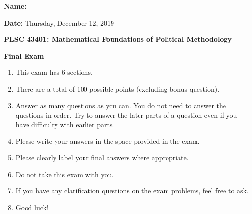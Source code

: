 \documentclass[10pt,letterpaper]{article}
\newcommand\blankpage{%
	\null
	\thispagestyle{empty}%
	\addtocounter{page}{-1}%
	\newpage}
\theoremstyle{definition}
\numberwithin{equation}{section}
\begin{document}
	
\onehalfspacing
	
\textbf{Name:}

\textbf{Date:} Thursday, December 12, 2019

\textbf{PLSC 43401: Mathematical Foundations of Political Methodology}

\textbf{Final Exam}

\begin{enumerate}
	
	\item This exam has 6 sections.
	
	\item There are a total of 100 possible points (excluding bonus question).
	
	\item Answer as many questions as you can. You do not need to answer the questions in order. Try to answer the later parts of a question even if you have difficulty with earlier parts.
	
	\item Please write your answers in the space provided in the exam.
	
	\item Please clearly label your final answers where appropriate.
	
	\item Do not take this exam with you.
	
	\item If you have any clarification questions on the exam problems, feel free to ask.
	
	\item Good luck!
		
\end{enumerate}

\afterpage{\blankpage}
\end{document}

